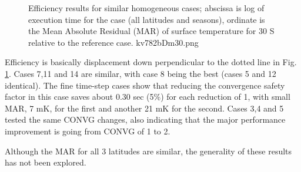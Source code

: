 \documentclass{article}
\begin{document}
\begin{figure}[!ht] 
\caption[Accuracy versus time]{Efficiency results for similar homogeneous cases;
  abscissa is log of execution time for the case (all latitudes and seasons),
  ordinate is the Mean Absolute Residual (MAR) of surface temperature for 30\qd
  S relative to the reference case.
\label{kv782bDm30} kv782bDm30.png  }
\end{figure} 

 Efficiency is basically displacement down perpendicular to the dotted line in
 Fig. \ref{kv782bDm30}. Cases 7,11 and 14 are similar, with case 8 being the
 best (cases 5 and 12 identical).  The fine time-step cases show that reducing
 the convergence safety factor in this case saves about 0.30 sec (5\%) for each
 reduction of 1, with small MAR, 7 mK, for the first and another 21 mK for the
 second. Cases 3,4 and 5 tested the same CONVG changes, also indicating that the
 major performance improvement is going from CONVG of 1 to 2.

Although the MAR for all 3 latitudes are similar, the generality of these
results has not been explored.
\end{document}
